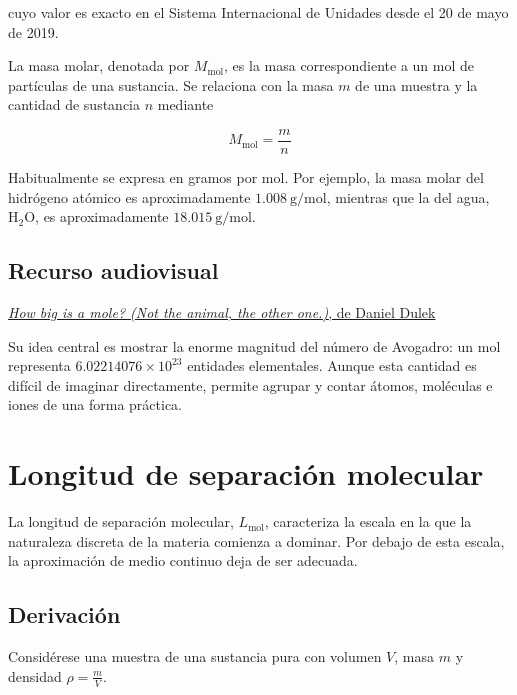 cuyo valor es exacto en el Sistema Internacional de Unidades desde el 20 de
mayo de 2019.

La masa molar, denotada por $M_{\mathrm{mol}}$, es la masa correspondiente a
un mol de partículas de una sustancia. Se relaciona con la masa $m$ de una
muestra y la cantidad de sustancia $n$ mediante

$$M_{\mathrm{mol}} = \frac{m}{n}$$

\figuraMolMasaMolar

Habitualmente se expresa en gramos por mol. Por ejemplo, la masa molar del
hidrógeno atómico es aproximadamente $1.008\ \mathrm{g/mol}$, mientras que la
del agua, $\mathrm{H_2O}$, es aproximadamente $18.015\ \mathrm{g/mol}$.

\subsection*{Recurso audiovisual}

\href{https://www.youtube.com/watch?v=TEl4jeETVmg}
{\textit{How big is a mole? (Not the animal, the other one.)}, de Daniel Dulek}

Su idea central es mostrar la enorme
magnitud del número de Avogadro: un mol representa
$6.02214076\times10^{23}$ entidades elementales. Aunque esta cantidad es
difícil de imaginar directamente, permite agrupar y contar átomos, moléculas e
iones de una forma práctica.

\section{Longitud de separación molecular}

La longitud de separación molecular, $L_{\mathrm{mol}}$, caracteriza la escala
en la que la naturaleza discreta de la materia comienza a dominar. Por debajo
de esta escala, la aproximación de medio continuo deja de ser adecuada.

\figuraSeparacionMolecular

\subsection{Derivación}

Considérese una muestra de una sustancia pura con volumen $V$, masa $m$ y
densidad $\rho = \frac{m}{V}$.

